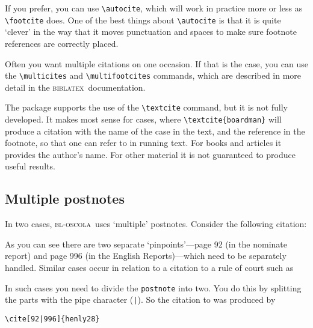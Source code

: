 \documentclass[a4paper,
               11pt,
	       DIV=1,			   
	       footinclude=false]
	      {scrartcl}
\newcommand{\oscola}{\textsc{bl-oscola}}
\newcommand{\biblatex}{\textsc{biblatex}}
\newcounter{egcounter}\setcounter{egcounter}{0}
\newlength{\boxwidth}
\newenvironment{bibexample}[1][]
{%
  \medskip\par\noindent\ignorespaces
  \marginpar{[\refstepcounter{egcounter}\arabic{egcounter}]\label{#1}}%
  \setlength{\boxwidth}{0.95\linewidth}%
  \addtolength{\boxwidth}{-2\fboxsep}
  \addtolength{\boxwidth}{-2\fboxrule}
  \begin{lrbox}{\boxcontainer}
  \begin{minipage}[t]{\boxwidth}%
}
{%
  \end{minipage}\end{lrbox}%
  \colorbox{gray!30}{\usebox{\boxcontainer}}
  \par\medskip}
\begin{document}
If you prefer, you can use \verb|\autocite|, which will work in
practice more or less as \verb|\footcite| does.
One of the best things about
\verb|\autocite| is that it is quite `clever' in the way that it moves
punctuation and spaces to make sure footnote references are correctly
placed.

Often you want multiple citations on one occasion. If that is the
case, you can use the \verb|\multicites| and \verb|\multifootcites|
commands, which are described in more detail in the \biblatex\
documentation.

The package supports the use of the \verb|\textcite| command, but it is not fully developed. It makes most sense for cases, where \verb|\textcite{boardman}| will produce a citation with the name of the case in the text, and the reference in the footnote, so that one can refer to \textcite{boardman} in running text. For books and articles it provides the author's name. For other material it is not guaranteed to produce useful results.



\subsection{Multiple postnotes}
 In two cases, \oscola\ uses `multiple' postnotes. Consider the following citation:
\begin{center}
\cite[92|996]{henly28}
\end{center}
As you can see there are two separate `pinpoints'---{}page 92 (in the nominate report) and page 996 (in the English Reports){}---which need to be separately handled. Similar cases occur in relation to a citation to a rule of court such as
\begin{center}
\cite[11|6]{rsc}
\end{center} 

In such cases you need to divide the \texttt{postnote} into two. You do this by splitting the parts with the pipe character (\verb=|=). So the citation to  was produced by
\begin{bibexample}[doublepostnote]
\begin{verbatim}
\cite[92|996]{henly28}
\end{verbatim}
\end{bibexample}
\end{document}
